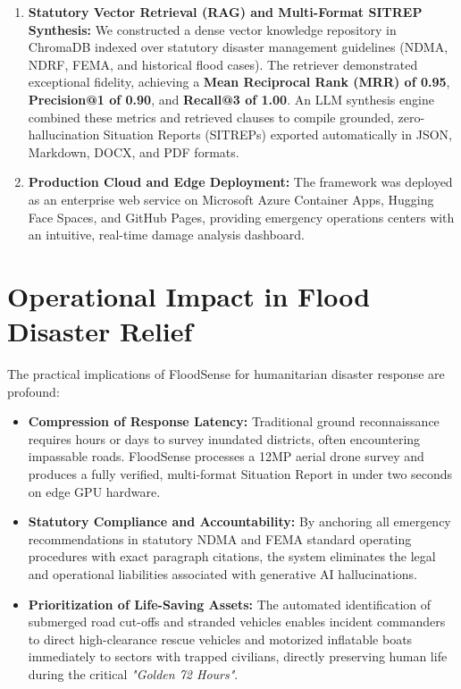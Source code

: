 \begin{enumerate}
    \item \textbf{Statutory Vector Retrieval (RAG) and Multi-Format SITREP Synthesis:} We constructed a dense vector knowledge repository in ChromaDB indexed over statutory disaster management guidelines (NDMA, NDRF, FEMA, and historical flood cases). The retriever demonstrated exceptional fidelity, achieving a \textbf{Mean Reciprocal Rank (MRR) of 0.95}, \textbf{Precision@1 of 0.90}, and \textbf{Recall@3 of 1.00}. An LLM synthesis engine combined these metrics and retrieved clauses to compile grounded, zero-hallucination Situation Reports (SITREPs) exported automatically in JSON, Markdown, DOCX, and PDF formats.
    \item \textbf{Production Cloud and Edge Deployment:} The framework was deployed as an enterprise web service on Microsoft Azure Container Apps, Hugging Face Spaces, and GitHub Pages, providing emergency operations centers with an intuitive, real-time damage analysis dashboard.
\end{enumerate}

\section{Operational Impact in Flood Disaster Relief}
The practical implications of FloodSense for humanitarian disaster response are profound:
\begin{itemize}
    \item \textbf{Compression of Response Latency:} Traditional ground reconnaissance requires hours or days to survey inundated districts, often encountering impassable roads. FloodSense processes a 12MP aerial drone survey and produces a fully verified, multi-format Situation Report in under two seconds on edge GPU hardware.
    \item \textbf{Statutory Compliance and Accountability:} By anchoring all emergency recommendations in statutory NDMA and FEMA standard operating procedures with exact paragraph citations, the system eliminates the legal and operational liabilities associated with generative AI hallucinations.
    \item \textbf{Prioritization of Life-Saving Assets:} The automated identification of submerged road cut-offs and stranded vehicles enables incident commanders to direct high-clearance rescue vehicles and motorized inflatable boats immediately to sectors with trapped civilians, directly preserving human life during the critical \textit{"Golden 72 Hours"}.
\end{itemize}

